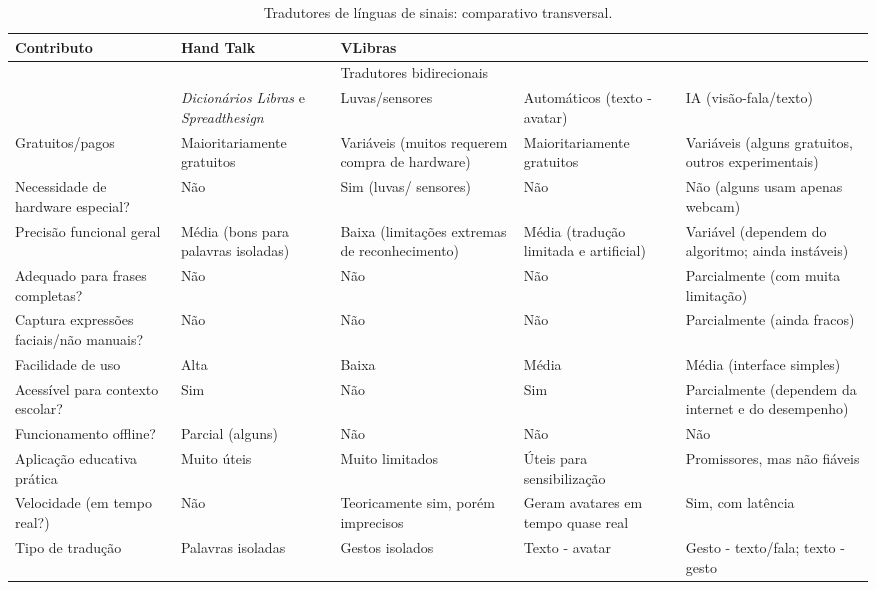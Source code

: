 \documentclass[portuguese]{textolivre}
\begin{document}
\begin{table}[htbp]
\centering
\footnotesize
\caption{Tradutores de línguas de sinais: comparativo transversal.}
\label{tab6}
\begin{threeparttable}
\begin{tabularx}{\textwidth}{
    >{\raggedright\arraybackslash}p{}
    >{\centering\arraybackslash}p{}
    >{\centering\arraybackslash}p{}
    >{\centering\arraybackslash}p{}
    >{\raggedright\arraybackslash}p{}
}

\toprule
Contributo &
Hand Talk &
VLibras \\
\midrule
\multirow{2}{=}{Critério transversal} &
\multicolumn{3}{>{\centering\arraybackslash}p{0.45\textwidth}}{Tradutores unidirecionais} & Tradutores bidirecionais \\
& \emph{Dicionários}
\emph{Libras} e \emph{Spreadthesign} & Luvas/sensores & Automáticos (texto - avatar) & IA (visão-fala/texto) \\
\midrule
Gratuitos/pagos & Maioritariamente gratuitos & Variáveis
(muitos requerem compra de hardware) & Maioritariamente gratuitos &
Variáveis (alguns gratuitos, outros experimentais) \\
Necessidade de hardware especial? & Não & Sim (luvas/ sensores)
& Não & Não (alguns usam apenas webcam) \\
Precisão funcional geral & Média (bons para palavras isoladas)
& Baixa (limitações extremas de reconhecimento) & Média (tradução
limitada e artificial) & Variável (dependem do algoritmo; ainda
instáveis) \\
Adequado para frases completas? & Não & Não & Não &
Parcialmente (com muita limitação) \\
Captura expressões faciais/não manuais? & Não & Não & Não &
Parcialmente (ainda fracos) \\
Facilidade de uso & Alta & Baixa & Média & Média (interface
simples) \\
Acessível para contexto escolar? & Sim & Não & Sim &
Parcialmente (dependem da internet e do desempenho) \\
Funcionamento offline? & Parcial (alguns) & Não & Não & Não \\
Aplicação educativa prática & Muito úteis & Muito limitados &
Úteis para sensibilização & Promissores, mas não fiáveis \\
Velocidade (em tempo real?) & Não & Teoricamente sim, porém
imprecisos & Geram avatares em tempo quase real & Sim, com latência \\
Tipo de tradução & Palavras isoladas & Gestos isolados & Texto
- avatar & Gesto - texto/fala; texto - gesto \\
\bottomrule
\end{tabularx}
\end{threeparttable}
\end{table}
\end{document}
